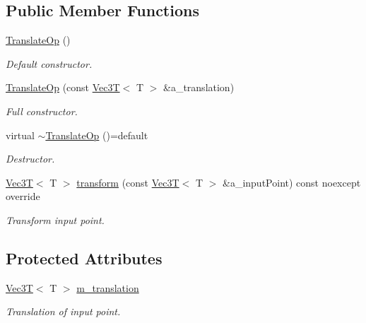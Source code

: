 \subsection*{Public Member Functions}
\begin{DoxyCompactItemize}
\item 
\mbox{\label{classTranslateOp_ab20f5a272d6cd34bf98fc23523913fc9}} 
\hyperlink{classTranslateOp_ab20f5a272d6cd34bf98fc23523913fc9}{Translate\+Op} ()
\begin{DoxyCompactList}\small\item\em Default constructor. \end{DoxyCompactList}\item 
\mbox{\label{classTranslateOp_ac646a47f26119d8316533c91f3043864}} 
\hyperlink{classTranslateOp_ac646a47f26119d8316533c91f3043864}{Translate\+Op} (const \hyperlink{classVec3T}{Vec3T}$<$ T $>$ \&a\+\_\+translation)
\begin{DoxyCompactList}\small\item\em Full constructor. \end{DoxyCompactList}\item 
\mbox{\label{classTranslateOp_ad96b4ec0f30fb98dbd684afef1bfff03}} 
virtual \hyperlink{classTranslateOp_ad96b4ec0f30fb98dbd684afef1bfff03}{$\sim$\+Translate\+Op} ()=default
\begin{DoxyCompactList}\small\item\em Destructor. \end{DoxyCompactList}\item 
\mbox{\label{classTranslateOp_a16941d9e52b02d39f9c92f6b23f61af6}} 
\hyperlink{classVec3T}{Vec3T}$<$ T $>$ \hyperlink{classTranslateOp_a16941d9e52b02d39f9c92f6b23f61af6}{transform} (const \hyperlink{classVec3T}{Vec3T}$<$ T $>$ \&a\+\_\+input\+Point) const noexcept override
\begin{DoxyCompactList}\small\item\em Transform input point. \end{DoxyCompactList}\end{DoxyCompactItemize}
\subsection*{Protected Attributes}
\begin{DoxyCompactItemize}
\item 
\mbox{\label{classTranslateOp_a35f16c6a9cf4c03edffa19d86e73d27a}} 
\hyperlink{classVec3T}{Vec3T}$<$ T $>$ \hyperlink{classTranslateOp_a35f16c6a9cf4c03edffa19d86e73d27a}{m\+\_\+translation}
\begin{DoxyCompactList}\small\item\em Translation of input point. \end{DoxyCompactList}\end{DoxyCompactItemize}


